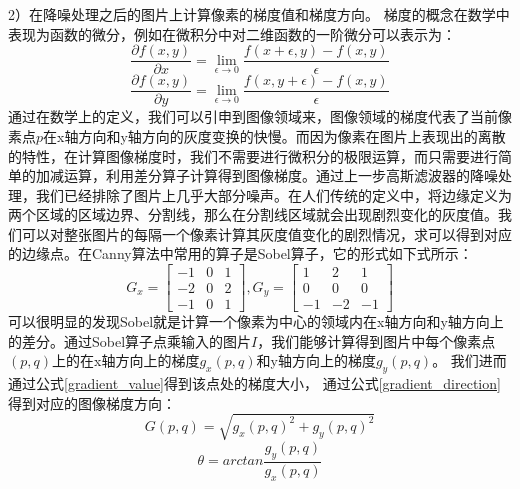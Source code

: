 \documentclass[master]{thesis-uestc}
\begin{document}
2）在降噪处理之后的图片上计算像素的梯度值和梯度方向。 梯度的概念在数学中表现为函数的微分，例如在微积分中对二维函数的一阶微分可以表示为：
\begin{equation}
    \frac{\partial f(x, y)}{\partial x} = \lim_{\epsilon \to  0} \frac{f(x + \epsilon, y) - f(x, y)}{\epsilon }
\end{equation}
\begin{equation}
    \frac{\partial f(x, y)}{\partial y} = \lim_{\epsilon \to  0} \frac{f(x, y+ \epsilon) - f(x, y)}{\epsilon }
\end{equation}
通过在数学上的定义，我们可以引申到图像领域来，图像领域的梯度代表了当前像素点$p$在x轴方向和y轴方向的灰度变换的快慢。而因为像素在图片上表现出的离散的特性，在计算图像梯度时，我们不需要进行微积分的极限运算，而只需要进行简单的加减运算，利用差分算子计算得到图像梯度。通过上一步高斯滤波器的降噪处理，我们已经排除了图片上几乎大部分噪声。在人们传统的定义中，将边缘定义为两个区域的区域边界、分割线，那么在分割线区域就会出现剧烈变化的灰度值。我们可以对整张图片的每隔一个像素计算其灰度值变化的剧烈情况，求可以得到对应的边缘点。在Canny算法中常用的算子是Sobel算子，它的形式如下式所示：
\begin{equation}
    G_x = 
        \left[
        \begin{matrix}
          -1 & 0 & 1 \\
          -2 & 0 & 2 \\
          -1 & 0 & 1
         \end{matrix}
        \right] 
    , G_y = 
    \left[
        \begin{matrix}
          1 & 2 & 1 \\
          0 & 0 & 0 \\
          -1 & -2 & -1
         \end{matrix}
        \right] 
\end{equation}
可以很明显的发现Sobel就是计算一个像素为中心的领域内在x轴方向和y轴方向上的差分。通过Sobel算子点乘输入的图片$I$，我们能够计算得到图片中每个像素点$(p, q)$上的在x轴方向上的梯度$g_x(p, q)$和y轴方向上的梯度$g_y(p, q)$。  我们进而通过公式\eqref{gradient_value}得到该点处的梯度大小， 通过公式\eqref{gradient_direction}得到对应的图像梯度方向：
\begin{equation}
    \label{gradient_value}
    G(p, q) = \sqrt{g_x(p, q)^2 + g_y(p, q) ^ 2}
\end{equation}
\begin{equation}
    \label{gradient_direction}
    \theta = arctan \frac{g_y(p, q)}{g_x(p, q)}
\end{equation}
\end{document}
